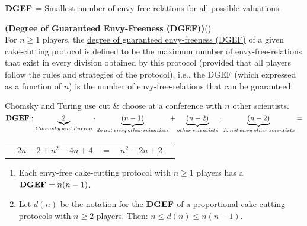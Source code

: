 \underline{$\text{\textbf{DGEF}}$} = Smallest number of envy-free-relations for all possible valuations.
\begin{defi}{\textbf{(Degree of Guaranteed Envy-Freeness (DGEF))}}(\cite{lindner:degrees})\\
For $n \geq 1$ players, the \underline{degree of guaranteed envy-freeness (DGEF)} of a given cake-cutting protocol is defined to be the maximum number of envy-free-relations that exist in every division obtained by this protocol (provided that all players follow the rules and strategies of the protocol), i.e., the DGEF (which expressed as a function of $n$) is the number of envy-free-relations that can be guaranteed. 
\end{defi}
\begin{protokoll*}
 Chomsky and Turing use cut $\&$ choose at a conference with $n$ other scientists.\\
 $\text{\textbf{DGEF}}: \underbrace{2}_{Chomsky\: and\: Turing} \cdot \underbrace{(n-1)}_{do\: not\: envy\: other\: scientists}+\underbrace{(n-2)}_{other\: scientists}\cdot \underbrace{(n-2)}_{do\: not\: envy\: other\: scientists}=$
\begin{tabular*}{\textwidth}{@{\extracolsep{\fill}}crclc}
 &$ 2n-2+n^2-4n+4$&$=$&$n^2-2n+2$&\\
 \end{tabular*}
\end{protokoll*}
\begin{satz*}
 \begin{enumerate}
  \item Each envy-free cake-cutting protocol with $n\geq1$ players has a \\$\text{\textbf{DGEF}} = n(n-1)$.
  \item Let $d(n)$ be the notation for the $\text{\textbf{DGEF}}$ of a proportional cake-cutting protocols with $n\geq2$ players. Then: $n\leq d(n)\leq n(n-1)$.
 \end{enumerate}
\end{satz*}
